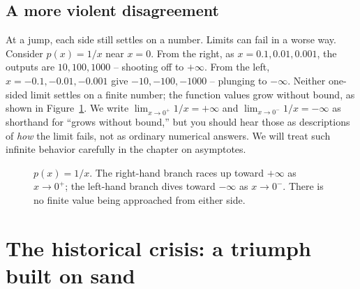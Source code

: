 \subsection{A more violent disagreement}

At a jump, each side still settles on a number. Limits can fail in a worse
way. Consider $p(x) = 1/x$ near $x = 0$. From the right, as $x = 0.1, 0.01, 0.001$, the
outputs are $10, 100, 1000$ -- shooting off to $+\infty$. From the left, $x = -0.1, -0.01,
-0.001$ give $-10, -100, -1000$ -- plunging to $-\infty$. Neither one-sided limit settles on a
finite number; the function values grow without bound, as shown in Figure~\ref{ch05:reciprocal}. We write
$\lim_{x\to 0^+} 1/x = +\infty$ and $\lim_{x\to 0^-} 1/x = -\infty$ as shorthand for ``grows
without bound,'' but you should hear those as descriptions of \emph{how} the limit fails, not as
ordinary numerical answers. We will treat such infinite behavior carefully in the chapter on
asymptotes.

\begin{figure}[htbp]
\centering
{}
\caption{$p(x)=1/x$. The right-hand branch races up toward $+\infty$ as $x\to 0^+$; the
left-hand branch dives toward $-\infty$ as $x\to 0^-$. There is no finite value being
approached from either side.}
\label{ch05:reciprocal}
\end{figure}

\section{The historical crisis: a triumph built on sand}

